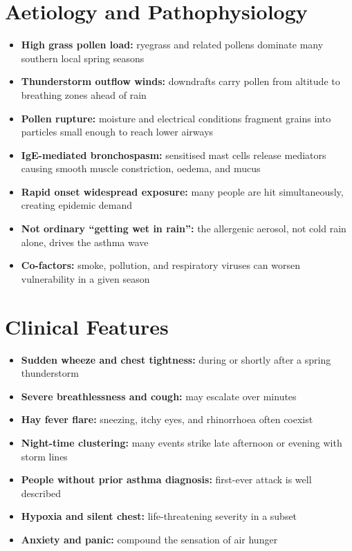 \section*{Aetiology and Pathophysiology}
\begin{itemize}
    \item \textbf{High grass pollen load:} ryegrass and related pollens dominate many southern local spring seasons
    \item \textbf{Thunderstorm outflow winds:} downdrafts carry pollen from altitude to breathing zones ahead of rain
    \item \textbf{Pollen rupture:} moisture and electrical conditions fragment grains into particles small enough to reach lower airways
    \item \textbf{IgE-mediated bronchospasm:} sensitised mast cells release mediators causing smooth muscle constriction, oedema, and mucus
    \item \textbf{Rapid onset widespread exposure:} many people are hit simultaneously, creating epidemic demand
    \item \textbf{Not ordinary ``getting wet in rain'':} the allergenic aerosol, not cold rain alone, drives the asthma wave
    \item \textbf{Co-factors:} smoke, pollution, and respiratory viruses can worsen vulnerability in a given season
\end{itemize}

\section*{Clinical Features}
\begin{itemize}
    \item \textbf{Sudden wheeze and chest tightness:} during or shortly after a spring thunderstorm
    \item \textbf{Severe breathlessness and cough:} may escalate over minutes
    \item \textbf{Hay fever flare:} sneezing, itchy eyes, and rhinorrhoea often coexist
    \item \textbf{Night-time clustering:} many events strike late afternoon or evening with storm lines
    \item \textbf{People without prior asthma diagnosis:} first-ever attack is well described
    \item \textbf{Hypoxia and silent chest:} life-threatening severity in a subset
    \item \textbf{Anxiety and panic:} compound the sensation of air hunger
\end{itemize}


